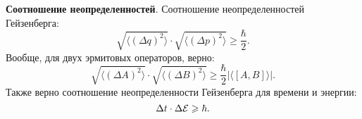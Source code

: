 \textbf{Соотношение неопределенностей}. Соотношение неопределенностей Гейзенберга:
\begin{equation*}
    \sqrt{\langle (\Delta q)^2\rangle} \cdot \sqrt{\langle (\Delta p)^2\rangle} \geq \frac{\hbar}{2}.
\end{equation*}
Вообще, для двух эрмитовых операторов, верно:
\begin{equation*}
    \sqrt{\langle (\Delta A)^2\rangle} \cdot \sqrt{\langle (\Delta B)^2\rangle} \geq \frac{\hbar}{2} 
    | \langle \left[A, B\right]\rangle|.
\end{equation*}
Также верно соотношение неопределенности Гейзенберга для времени и энергии:
\begin{equation*}
    \Delta t \cdot \Delta \mathcal E \geqslant \hbar.
\end{equation*}